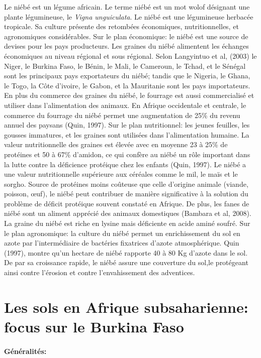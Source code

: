 \documentclass[a4paper,11pt]{article}
\begin{document}
Le niébé est un légume africain. Le terme niébé est un mot wolof
désignant une plante légumineuse, le \emph{Vigna unguiculata}. Le niébé est
une légumineuse herbacée tropicale. Sa culture présente des retombées
économiques, nutritionnelles, et agronomiques considérables. Sur le
plan économique: le niébé est une source de devises pour les pays
producteurs. Les graines du niébé alimentent les échanges économiques
au niveau régional et sous régional. Selon Langyintuo et al, (2003) le
Niger, le Burkina Faso, le Bénin, le Mali, le Cameroun, le Tchad, et
le Sénégal sont les principaux pays exportateurs du niébé; tandis que
le Nigeria, le Ghana, le Togo, la Côte d’ivoire, le Gabon, et la
Mauritanie sont les pays importateurs. En plus du commerce des graines
du niébé, le fourrage est aussi commercialisé et utiliser dans
l’alimentation des animaux. En Afrique occidentale et centrale, le
commerce du fourrage du niébé permet une augmentation de 25\% du
revenu annuel des paysans (Quin, 1997). Sur le plan nutritionnel: les
jeunes feuilles, les gousses immatures, et les graines sont utilisées
dans l’alimentation humaine. La valeur nutritionnelle des graines est
élevée avec en moyenne 23 à 25\% de protéines et 50 à 67\% d’amidon,
ce qui confère au niébé un rôle important dans la lutte contre la
déficience protéique chez les enfants (Quin, 1997). Le niébé a une
valeur nutritionnelle supérieure aux céréales comme le mil, le maïs et
le sorgho. Source de protéines moins coûteuse que celle d’origine
animale (viande, poisson, œuf), le niébé peut contribuer de manière
significative à la solution du problème de déficit protéique souvent
constaté en Afrique. De plus, les fanes de niébé sont un aliment
apprécié des animaux domestiques (Bambara et al, 2008). La graine du
niébé est riche en lysine mais déficiente en acide aminé soufré. Sur
le plan agronomique: la culture du niébé permet un enrichissement du
sol en azote par l’intermédiaire de bactéries fixatrices d’azote
atmosphérique. Quin (1997), montre qu’un hectare de niébé rapporte
 40 à 80 Kg d’azote dans le sol. De par sa croissance rapide, le niébé
assure une couverture du sol,le protégeant ainsi contre l’érosion et
contre l’envahissement des adventices\cite{Doggett_1988}.

\section{Les sols en Afrique subsaharienne: focus sur le Burkina Faso}

\paragraph{Généralités:}
\end{document}
